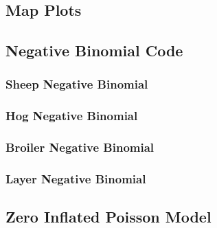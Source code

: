 \documentclass[
]{article}
\begin{document}
\subsection{Map Plots}\label{map-plots}

\subsection{Negative Binomial Code}\label{negative-binomial-code}

\subsubsection{Sheep Negative Binomial}\label{sheep-negative-binomial}

\subsubsection{Hog Negative Binomial}\label{hog-negative-binomial}

\subsubsection{Broiler Negative
Binomial}\label{broiler-negative-binomial}

\subsubsection{Layer Negative Binomial}\label{layer-negative-binomial}

\subsection{Zero Inflated Poisson
Model}\label{zero-inflated-poisson-model}
\end{document}
